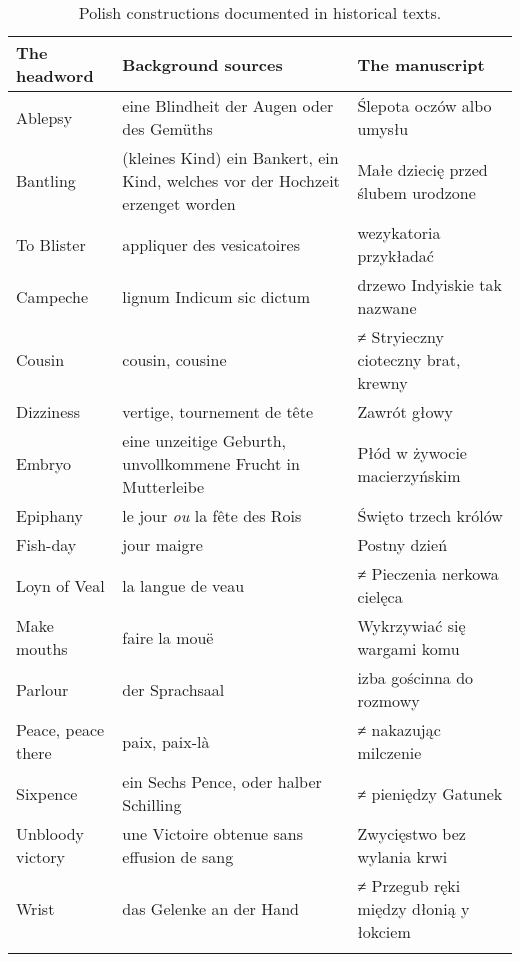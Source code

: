 \documentclass[output=paper,colorlinks,citecolor=brown,arabicfont,chinesefont]{langscibook}
\begin{document}
\begin{table}[t]
\small
\caption{Polish constructions documented in historical texts.}
\label{tab:Podhajecka:table1}
\begin{tabularx}{\linewidth}{lQQ}
\lsptoprule
The headword & Background sources & The manuscript \\\midrule
Ablepsy & eine Blindheit der Augen oder des Gemüths & Ślepota oczów albo umysłu \\
Bantling & (kleines Kind) ein Bankert, ein Kind, welches vor der Hochzeit erzenget worden & Małe dziecię przed ślubem urodzone \\
To Blister & appliquer des vesicatoires & wezykatoria przykładać \\
Campeche & lignum Indicum sic dictum & drzewo Indyiskie tak nazwane \\
Cousin & cousin, cousine & ≠ Stryieczny cioteczny brat, krewny \\
Dizziness & vertige, tournement de tête & Zawrót głowy \\
Embryo & eine unzeitige Geburth, unvollkommene Frucht in Mutterleibe & Płód w żywocie macierzyńskim \\
Epiphany & le jour \emph{ou} la fête des Rois & Święto trzech królów \\
Fish-day & jour maigre & Postny dzień \\
Loyn of Veal & la langue de veau & ≠ Pieczenia nerkowa cielęca \\
Make mouths & faire la mouë & Wykrzywiać się wargami komu \\
Parlour & der Sprachsaal & izba gościnna do rozmowy \\
Peace, peace there & paix, paix-là & ≠ nakazując milczenie \\
Sixpence & ein Sechs Pence, oder halber Schilling & ≠ pieniędzy Gatunek \\
Unbloody victory & une Victoire obtenue sans effusion de sang  & Zwycięstwo bez wylania krwi \\
Wrist & das Gelenke an der Hand & ≠ Przegub ręki między dłonią y łokciem  \\
\lspbottomrule
\end{tabularx}
\end{table}
\end{document}
